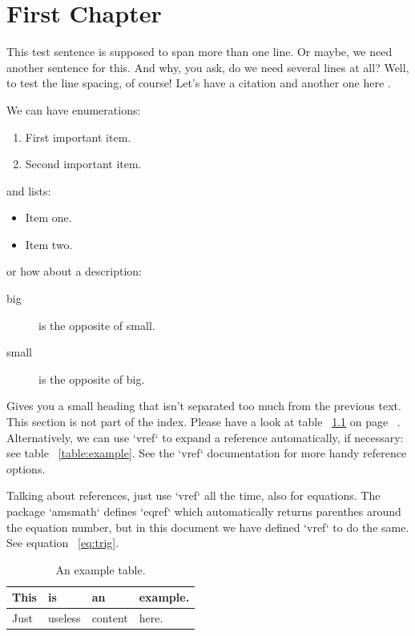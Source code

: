 \chapter{First Chapter}
This test sentence is supposed to span more than one line.
Or maybe, we need another sentence for this.
And why, you ask, do we need several lines at all?
Well, to test the line spacing, of course!
Let's have a citation \cite{kalman1960new} and another one here \cite{nowak2003efficient}.

We can have enumerations:
\begin{enumerate}
    \item First important item.
    \item Second important item.
\end{enumerate}
and lists:
\begin{itemize}
    \item Item one.
    \item Item two.
\end{itemize}
or how about a description:
\begin{description}
    \item[big] is the opposite of small.
    \item[small] is the opposite of big.
\end{description}

Gives you a small heading that isn't separated too much from the previous text.
This section is not part of the index.
Please have a look at table ~\ref{table:example} on page ~\pageref{table:example}.
Alternatively, we can use `vref` to expand a reference automatically, if necessary:
see table ~\vref{table:example}.
See the `vref` documentation for more handy reference options.

Talking about references, just use `vref` all the time, also for equations.
The package `amsmath` defines `eqref` which automatically returns parenthes around the equation number, but in this document we have defined `vref` to do the same.
See equation ~\vref{eq:trig}.

\begin{table}
    \centering
    \begin{tabular}{llll}
        This & is & an & example. \\\hline
        Just & useless & content & here.
    \end{tabular}
    \caption{An example table.}
    \label{table:example}
\end{table}

